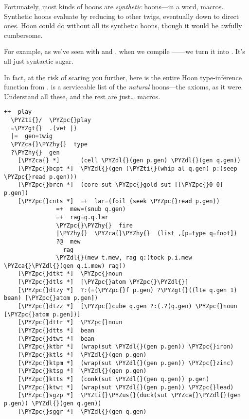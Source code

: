 Fortunately, most kinds of hoons are \emph{synthetic} hoons---in a word,
macros.  Synthetic hoons evaluate by reducing to other twigs,
eventually down to direct ones.  Hoon could do without all its
synthetic hoons, though it would be awfully cumbersome.

For example, as we've seen with  and , when we compile
---\kode{[\%wtdt p q r]}---we turn it into \kode{[\%wtcl p r q]}.
It's all just syntactic sugar.

In fact, at the risk of scaring you further, here is the entire
Hoon type-inference function from .   is a 
serviceable list of the \emph{natural} hoons---the axioms, as it
were.  Understand all these, and the rest are just\ldots{} macros.

\begin{framed_shaded}
\begin{Verbatim}[fontsize=\relsize{-2.5},fontseries=b,commandchars=\\\{\}]
++  play
  \PYZti{}/  \PYZpc{}play
  =\PYZgt{}  .(vet |)
  |=  gen=twig
  \PYZca{}\PYZhy{}  type
  ?\PYZhy{}  gen
    [\PYZca{} *]      (cell \PYZdl{}(gen p.gen) \PYZdl{}(gen q.gen))
    [\PYZpc{}bcpt *]  \PYZdl{}(gen (\PYZti{}(whip al q.gen) p:(seep \PYZpc{}read p.gen)))
    [\PYZpc{}brcn *]  (core sut \PYZpc{}gold sut [[\PYZpc{}0 0] p.gen])
    [\PYZpc{}cnts *]  =+  lar=(foil (seek \PYZpc{}read p.gen))
               =+  mew=(snub q.gen)
               =+  rag=q.q.lar
               \PYZpc{}\PYZhy{}  fire
               |\PYZhy{}  \PYZca{}\PYZhy{}  (list ,[p=type q=foot])
               ?@  mew
                 rag
               \PYZdl{}(mew t.mew, rag q:(tock p.i.mew \PYZca{}\PYZdl{}(gen q.i.mew) rag))
    [\PYZpc{}dtkt *]  \PYZpc{}noun
    [\PYZpc{}dtls *]  [\PYZpc{}atom \PYZpc{}\PYZdl{}]
    [\PYZpc{}dtzy *]  ?:(=(\PYZpc{}f p.gen) ?\PYZgt{}((lte q.gen 1) bean) [\PYZpc{}atom p.gen])
    [\PYZpc{}dtzz *]  [\PYZpc{}cube q.gen ?:(.?(q.gen) \PYZpc{}noun [\PYZpc{}atom p.gen])]
    [\PYZpc{}dttr *]  \PYZpc{}noun
    [\PYZpc{}dtts *]  bean
    [\PYZpc{}dtwt *]  bean
    [\PYZpc{}ktbr *]  (wrap(sut \PYZdl{}(gen p.gen)) \PYZpc{}iron)
    [\PYZpc{}ktls *]  \PYZdl{}(gen p.gen)
    [\PYZpc{}ktpm *]  (wrap(sut \PYZdl{}(gen p.gen)) \PYZpc{}zinc)
    [\PYZpc{}ktsg *]  \PYZdl{}(gen p.gen)
    [\PYZpc{}ktts *]  (conk(sut \PYZdl{}(gen q.gen)) p.gen)
    [\PYZpc{}ktwt *]  (wrap(sut \PYZdl{}(gen p.gen)) \PYZpc{}lead)
    [\PYZpc{}sgzp *]  \PYZti{}\PYZus{}(duck(sut \PYZca{}\PYZdl{}(gen p.gen)) \PYZdl{}(gen q.gen))
    [\PYZpc{}sggr *]  \PYZdl{}(gen q.gen)

\end{Verbatim}
\end{framed_shaded}
